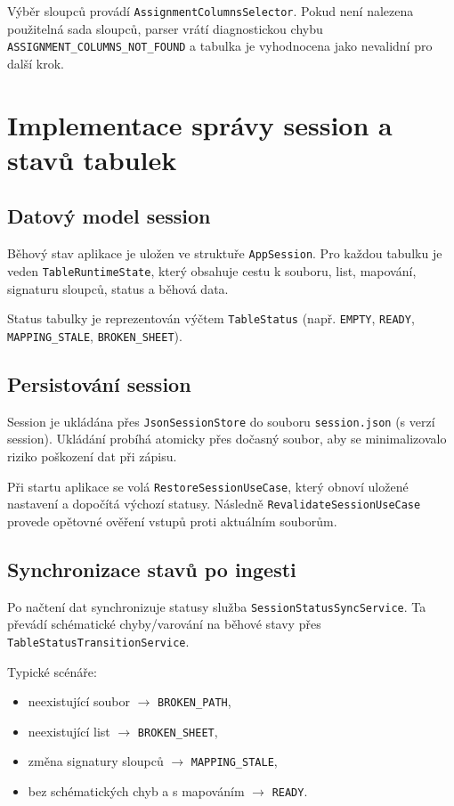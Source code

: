 \documentclass[czech, kiv, ba, he, iso690alph, pdf]{fasthesis}
\begin{document}
				Výběr sloupců provádí \texttt{AssignmentColumnsSelector}. Pokud není nalezena použitelná sada sloupců, parser vrátí diagnostickou chybu \texttt{ASSIGNMENT\_COLUMNS\_NOT\_FOUND} a tabulka je vyhodnocena jako nevalidní pro další krok.
	
		\section{Implementace správy session a stavů tabulek}
	
			\subsection{Datový model session}
				Běhový stav aplikace je uložen ve struktuře \texttt{AppSession}. Pro každou tabulku je veden \texttt{TableRuntimeState}, který obsahuje cestu k souboru, list, mapování, signaturu sloupců, status a běhová data.
	
				Status tabulky je reprezentován výčtem \texttt{TableStatus} (např. \texttt{EMPTY}, \texttt{READY}, \texttt{MAPPING\_STALE}, \texttt{BROKEN\_SHEET}).
	
			\subsection{Persistování session}
				Session je ukládána přes \texttt{JsonSessionStore} do souboru \texttt{session.json} (s verzí session). Ukládání probíhá atomicky přes dočasný soubor, aby se minimalizovalo riziko poškození dat při zápisu.
	
				Při startu aplikace se volá \texttt{RestoreSessionUseCase}, který obnoví uložené nastavení a dopočítá výchozí statusy. Následně \texttt{RevalidateSessionUseCase} provede opětovné ověření vstupů proti aktuálním souborům.
	
			\subsection{Synchronizace stavů po ingesti}
				Po načtení dat synchronizuje statusy služba \texttt{SessionStatusSyncService}. Ta převádí schématické chyby/varování na běhové stavy přes \texttt{TableStatusTransitionService}.
	
				Typické scénáře:
				\begin{itemize}
					\item neexistující soubor $\rightarrow$ \texttt{BROKEN\_PATH},
					\item neexistující list $\rightarrow$ \texttt{BROKEN\_SHEET},
					\item změna signatury sloupců $\rightarrow$ \texttt{MAPPING\_STALE},
					\item bez schématických chyb a s mapováním $\rightarrow$ \texttt{READY}.
				\end{itemize}
	
\end{document}
